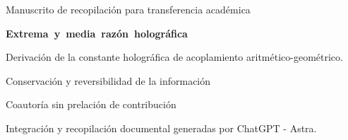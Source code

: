 \thispagestyle{empty}
\begin{center}
{\fontsize{10}{12}\selectfont Manuscrito de recopilación para transferencia académica\par}
\vspace{6mm}
{\fontsize{20}{24}\selectfont\bfseries\mbox{Extrema y media razón holográfica}\par}
\vspace{3mm}
{\fontsize{12}{15}\selectfont
Derivación de la constante holográfica de acoplamiento aritmético-geométrico.\par
Conservación y reversibilidad de la información\par}
\vspace{5mm}
{\fontsize{11.5}{14}\selectfont\Autores\par}
\vspace{2mm}
{\fontsize{8}{10}\selectfont Coautoría sin prelación de contribución\par
Integración y recopilación documental generadas por ChatGPT - Astra.\par}
\end{center}
\vspace{3mm}
